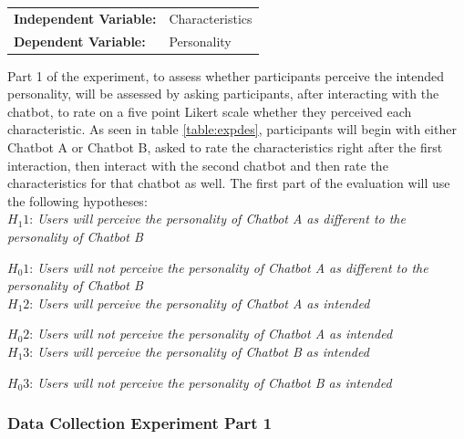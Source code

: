 \vspace{2,5mm}

\begin{tabular}{ l l }
    \textbf{Independent Variable:} & Characteristics \\ 
    \textbf{Dependent Variable:} & Personality \\  
\end{tabular}

\vspace{2,5mm}

Part 1 of the experiment, to assess whether participants perceive the intended personality, will be assessed by asking participants, after interacting with the chatbot, to rate on a five point Likert scale whether they perceived each characteristic. As seen in table \ref{table:expdes}, participants will begin with either Chatbot A or Chatbot B, asked to rate the characteristics right after the first interaction, then interact with the second chatbot and then rate the characteristics for that chatbot as well. The first part of the evaluation will use the following hypotheses:\\
    
    $H_1 1$: \textit{Users will perceive the personality of Chatbot A as different to the personality of Chatbot B}
    
    $H_0 1$: \textit{Users will not perceive the personality of Chatbot A as different to the personality of Chatbot B} \\
  
    $H_1 2$: \textit{Users will perceive the personality of Chatbot A as intended} 
    
    $H_0 2$: \textit{Users will not perceive the personality of Chatbot A as intended}\\
   
    $H_1 3$: \textit{Users will perceive the personality of Chatbot B as intended}
   
    $H_0 3$: \textit{Users will not perceive the personality of Chatbot B as intended}\\
    

\subsubsection{Data Collection Experiment Part 1}

